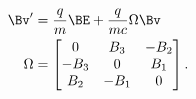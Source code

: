 \begin{align}\label{eqn:lorentzRotation:30}
\Bv' &= \frac{q}{m} \BE + \frac{q}{ m c } \Omega \Bv \\
\Omega &=
\begin{bmatrix}
0 & B_3 & -B_2 \\
-B_3 & 0 & B_1 \\
B_2 & -B_1 & 0 \\
\end{bmatrix}.
\end{align}
%
%
%
%
%
%
%
%
%
